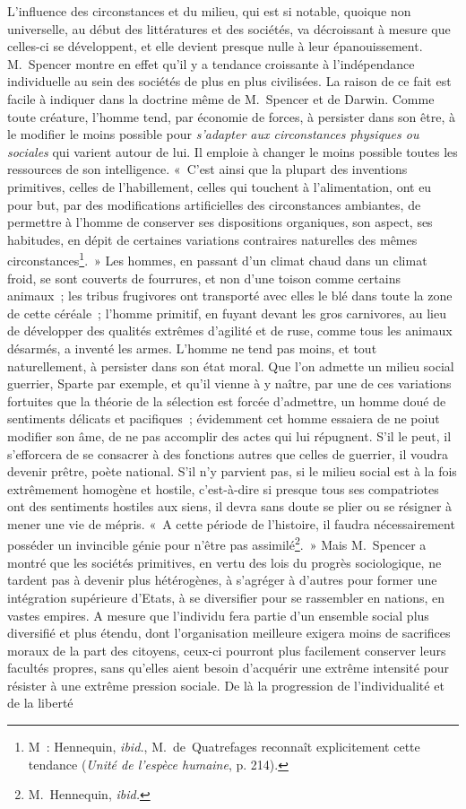 \documentclass[french,twoside]{book} %
\begin{document}
L’influence des circonstances et du milieu, qui est si notable, quoique non universelle, au début des littératures et des sociétés, va décroissant à mesure que celles-ci se développent, et elle devient presque nulle à leur épanouissement. M. Spencer montre en effet qu’il y a tendance croissante à l’indépendance individuelle au sein des sociétés de plus en plus civilisées. La raison de ce fait est facile à indiquer dans la doctrine même de M. Spencer et de Darwin. Comme toute créature, l’homme tend, par économie de forces, à persister dans son être, à le modifier le moins possible pour \emph{s’adapter aux circonstances physiques ou sociales} qui varient autour de lui. Il emploie à changer le moins possible toutes les ressources de son intelligence. « C’est ainsi que la plupart des inventions primitives, celles de l’habillement, celles qui touchent à l’alimentation, ont eu pour but, par des modifications artificielles des circonstances ambiantes, de permettre à l’homme de conserver ses dispositions organiques, son aspect, ses habitudes, en dépit de certaines variations contraires naturelles des mêmes circonstances\footnote{ M : Hennequin, \emph{ibid.}, M. de Quatrefages reconnaît explicitement cette tendance (\emph{Unité de l’espèce humaine}, p. 214).}. » Les hommes, en passant d’un climat chaud dans un climat froid, se sont couverts de fourrures, et non d’une toison comme certains animaux ; les tribus frugivores ont transporté avec elles le blé dans toute la zone de cette céréale ; l’homme primitif, en fuyant devant les gros carnivores, au lieu de développer des qualités extrêmes d’agilité et de ruse, comme tous les animaux désarmés, a inventé les armes. L’homme ne tend pas moins, et tout naturellement, à persister dans son état moral. Que l’on admette un milieu social guerrier, Sparte par exemple, et qu’il vienne à y naître, par une de ces variations fortuites que la théorie de la sélection est forcée d’admettre, un homme doué de sentiments délicats et pacifiques ; évidemment cet homme essaiera de ne poiut modifier son âme, de ne pas accomplir des actes qui lui répugnent. S’il le peut, il s’efforcera de se consacrer à des fonctions autres que celles de guerrier, il voudra devenir prêtre, poète national. S’il n’y parvient pas, si le milieu social est à la fois extrêmement homogène et hostile, c’est-à-dire si presque tous ses compatriotes ont des sentiments hostiles aux siens, il devra sans doute se plier ou se résigner à mener une vie de mépris. « A cette période de l’histoire, il faudra nécessairement posséder un invincible génie pour n’être pas assimilé\footnote{ M. Hennequin, \emph{ibid.}}. » Mais M. Spencer a montré que les sociétés primitives, en vertu des lois du progrès sociologique, ne tardent pas à devenir plus hétérogènes, à s’agréger à d’autres pour former une intégration supérieure d’Etats, à se diversifier pour se rassembler en nations, en vastes empires. A mesure que l’individu fera partie d’un ensemble social plus diversifié et plus étendu, dont l’organisation meilleure exigera moins de sacrifices moraux de la part des citoyens, ceux-ci pourront plus facilement conserver leurs facultés propres, sans qu’elles aient besoin d’acquérir une extrême intensité pour résister à une extrême pression sociale. De là la progression de l’individualité et de la liberté 
\end{document}
